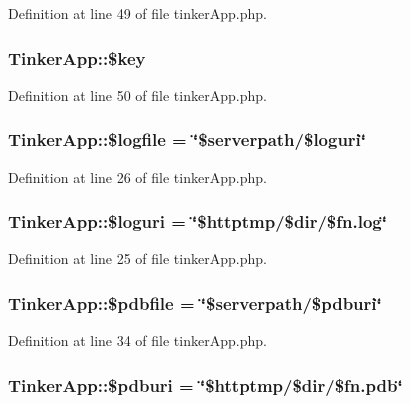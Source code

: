 Definition at line 49 of file tinker\-App.php.
\subsubsection{\setlength{\rightskip}{0pt plus 5cm}Tinker\-App::\$key}\label{classTinkerApp_o24}




Definition at line 50 of file tinker\-App.php.
\subsubsection{\setlength{\rightskip}{0pt plus 5cm}Tinker\-App::\$logfile = \char`\"{}\$serverpath/\$loguri\char`\"{}}\label{classTinkerApp_o9}




Definition at line 26 of file tinker\-App.php.
\subsubsection{\setlength{\rightskip}{0pt plus 5cm}Tinker\-App::\$loguri = \char`\"{}\$httptmp/\$dir/\$fn.log\char`\"{}}\label{classTinkerApp_o8}




Definition at line 25 of file tinker\-App.php.
\subsubsection{\setlength{\rightskip}{0pt plus 5cm}Tinker\-App::\$pdbfile = \char`\"{}\$serverpath/\$pdburi\char`\"{}}\label{classTinkerApp_o13}




Definition at line 34 of file tinker\-App.php.
\subsubsection{\setlength{\rightskip}{0pt plus 5cm}Tinker\-App::\$pdburi = \char`\"{}\$httptmp/\$dir/\$fn.pdb\char`\"{}}\label{classTinkerApp_o12}




